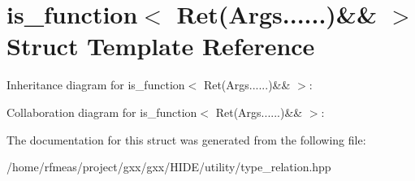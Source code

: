 \hypertarget{structis__function_3_01Ret_07Args_8_8_8_8_8_8_08_6_6_01_4}{}\section{is\+\_\+function$<$ Ret(Args......)\&\& $>$ Struct Template Reference}
\label{structis__function_3_01Ret_07Args_8_8_8_8_8_8_08_6_6_01_4}


Inheritance diagram for is\+\_\+function$<$ Ret(Args......)\&\& $>$\+:


Collaboration diagram for is\+\_\+function$<$ Ret(Args......)\&\& $>$\+:


The documentation for this struct was generated from the following file\+:\begin{DoxyCompactItemize}
\item 
/home/rfmeas/project/gxx/gxx/\+H\+I\+D\+E/utility/type\+\_\+relation.\+hpp\end{DoxyCompactItemize}
